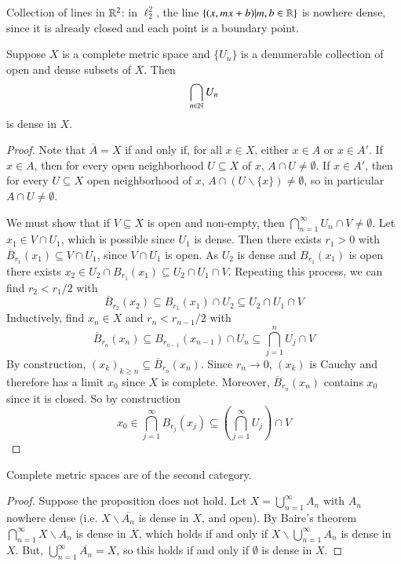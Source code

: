 \begin{eg}
    Collection of lines in $\mathbb R^2$: in $\ell_2^2$, the line $\{(x,mx+b) \vert m,b \in \mathbb R\}$ is nowhere dense, since it is already closed and each point is a boundary point.
\end{eg}

\begin{thm}[Baire]
    Suppose $X$ is a complete metric space and $\{U_n\}$ is a denumerable collection of open and dense subsets of $X$. Then $$\bigcap_{n\in\mathbb N}U_n$$ is dense in $X$.
\end{thm}
\begin{proof}
    Note that $\overline{A} = X$ if and only if, for all $x \in X$, either $x \in A$ or $x \in A'$. If $x \in A$, then for every open neighborhood $U \subseteq X$ of $x$, $A \cap U \neq \emptyset$. If $x \in A'$, then for every $U \subseteq X$ open neighborhood of $x$, $A\cap (U\backslash\{x\})\neq \emptyset$, so in particular $A\cap U \neq \emptyset$.

    We must show that if $V \subseteq X$ is open and non-empty, then $\bigcap_{n=1}^{\infty}U_n\cap V \neq \emptyset$. Let $x_1 \in V\cap U_1$, which is possible since $U_1$ is dense. Then there exists $r_1 > 0$ with $\overline{B}_{r_1}(x_1) \subseteq V\cap U_1$, since $V\cap U_1$ is open. As $U_2$ is dense and $B_{r_1}(x_1)$ is open there exists $x_2 \in U_2 \cap B_{r_1}(x_1) \subseteq U_2 \cap U_1 \cap V$. Repeating this process, we can find $r_2 < r_1/2$ with $$\overline{B}_{r_2}(x_2) \subseteq B_{r_1}(x_1)\cap U_2\subseteq U_2\cap U_1\cap V$$ Inductively, find $x_n \in X$ and $r_n < r_{n-1}/2$ with $$\overline{B}_{r_n}(x_n) \subseteq B_{r_{n-1}}(x_{n-1})\cap U_n\subseteq \bigcap_{j=1}^nU_j\cap V$$ By construction, $(x_k)_{k\geq n} \subseteq \overline{B}_{r_n}(x_n)$. Since $r_n\rightarrow 0$, $(x_k)$ is Cauchy and therefore has a limit $x_0$ since $X$ is complete. Moreover, $\overline{B}_{r_n}(x_n)$ contains $x_0$ since it is closed. So by construction $$x_0 \in \bigcap_{j=1}^{\infty}B_{r_j}(x_j) \subseteq \left(\bigcap_{j=1}^{\infty}U_j\right)\cap V$$
\end{proof}


\begin{cor}
    Complete metric spaces are of the second category.
\end{cor}
\begin{proof}
    Suppose the proposition does not hold. Let $X = \bigcup_{n=1}^{\infty}A_n$ with $A_n$ nowhere dense (i.e. $X\backslash \overline{A_n}$ is dense in $X$, and open). By Baire's theorem $\bigcap_{n=1}^{\infty}X\backslash \overline{A_n}$ is dense in $X$, which holds if and only if $X\backslash\bigcup_{n=1}^{\infty}\overline{A_n}$ is dense in $X$. But, $\bigcup_{n=1}^{\infty}\overline{A_n} = X$, so this holds if and only if $\emptyset$ is dense in $X$.
\end{proof}

